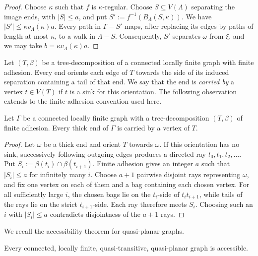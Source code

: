 \documentclass[a4paper]{amsart}
\begin{document}
\begin{proof}
Choose $\kappa$ such that $f$ is $\kappa$-regular.
Choose $S\subseteq V(\Lambda)$ separating the image ends, with $|S|\leq a$, and put $S':=f^{-1}(B_\Lambda(S,\kappa))$.
We have $|S'|\leq \kappa v_\Lambda(\kappa)a$.
Every path in $\Gamma-S'$ maps, after replacing its edges by paths of length at most $\kappa$, to a walk in $\Lambda-S$.
Consequently, $S'$ separates $\omega$ from $\xi$, and we may take $b=\kappa v_\Lambda(\kappa)a$.
\end{proof}

Let $(T,\beta)$ be a tree-decomposition of a connected locally finite graph with finite adhesion.
Every end orients each edge of $T$ towards the side of its induced separation containing a tail of that end.
We say that the end is \emph{carried by} a vertex $t\in V(T)$ if $t$ is a sink for this orientation.
The following observation extends \cite[Prop.~4.8(ii)]{hamann2022stallings} to the finite-adhesion convention used here.

\begin{lemma}\label{lem:thick-end-carried}
Let $\Gamma$ be a connected locally finite graph with a tree-decomposition $(T,\beta)$ of finite adhesion.
Every thick end of $\Gamma$ is carried by a vertex of $T$.
\end{lemma}

\begin{proof}
Let $\omega$ be a thick end and orient $T$ towards $\omega$.
If this orientation has no sink, successively following outgoing edges produces a directed ray $t_0,t_1,t_2,\ldots$.
Put $S_i:=\beta(t_i)\cap\beta(t_{i+1})$.
Finite adhesion gives an integer $a$ such that $|S_i|\leq a$ for infinitely many $i$.
Choose $a+1$ pairwise disjoint rays representing $\omega$, and fix one vertex on each of them and a bag containing each chosen vertex.
For all sufficiently large $i$, the chosen bags lie on the $t_i$-side of $t_it_{i+1}$, while tails of the rays lie on the strict $t_{i+1}$-side.
Each ray therefore meets $S_i$.
Choosing such an $i$ with $|S_i|\leq a$ contradicts disjointness of the $a+1$ rays.
\end{proof}

We recall the accessibility theorem for quasi-planar graphs.

\begin{theorem}\label{thm:quasi-planar-accessible}
Every connected, locally finite, quasi-transitive, quasi-planar graph is accessible.
\end{theorem}
\end{document}
